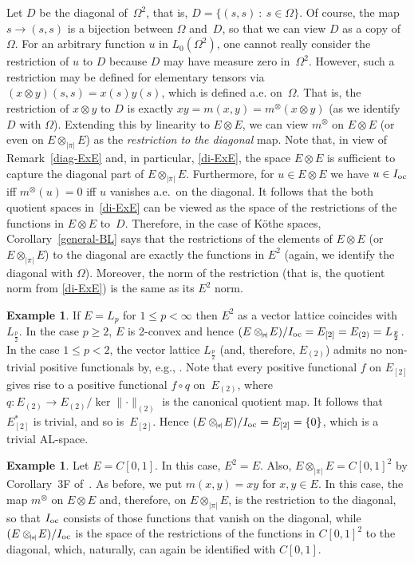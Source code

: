 \documentclass[12pt]{amsart}
\theoremstyle{plain}
\theoremstyle{definition}
\newtheorem{example}[theorem]{Example}
\newcommand{\abs}[1]{\lvert#1\rvert}
\newcommand{\norm}[1]{\lVert#1\rVert}
\renewcommand{\le}{\leqslant}
\renewcommand{\ge}{\geqslant}
\renewcommand{\mid}{\::\:}
\def\api{{\abs{\!\pi\!}}}
\def\ftp{\otimes_{\!\scriptscriptstyle\api}\!}
\def\Ioc{I_{\rm oc}}
\begin{document}
Let $D$ be the diagonal of~$\Omega^2$, that is, $D=\bigl\{(s,s)\mid
s\in\Omega\bigr\}$. Of course, the map $s\to (s,s)$ is a bijection
between $\Omega$ and~$D$, so that we can view $D$ as a copy
of~$\Omega$. For an arbitrary function $u$ in $L_0(\Omega^2)$, one
cannot really consider the restriction of $u$ to $D$ because $D$ may
have measure zero in~$\Omega^2$. However, such a restriction may be
defined for elementary tensors via $(x\otimes y)(s,s)=x(s)y(s)$, which
is defined a.e. on~$\Omega$. That is, the restriction of $x\otimes y$
to $D$ is exactly $xy=m(x,y)=m^\otimes(x\otimes y)$ (as we identify
$D$ with $\Omega$). Extending this by linearity to $E\otimes E$, we
can view $m^\otimes$ on $E\otimes E$ (or even on $E\ftp E$) as the
\textit{restriction to the diagonal} map. Note that, in view of
Remark~\ref{diag-ExE} and, in particular, \eqref{di-ExE}, the space
$E\otimes E$ is sufficient to capture the diagonal part of $E\ftp E$.
Furthermore, for $u\in E\otimes E$ we have $u\in \Ioc$ iff
$m^\otimes(u)=0$ iff $u$ vanishes a.e.\ on the diagonal. It follows
that the both quotient spaces in~\eqref{di-ExE} can be viewed as the
space of the restrictions of the functions in $E\otimes E$ to~$D$.
Therefore, in the case of K\"othe spaces, Corollary~\ref{general-BL}
says that the restrictions of the elements of $E\otimes E$ (or $E\ftp
E$) to the diagonal are exactly the functions in $E^2$ (again, we
identify the diagonal with $\Omega$). Moreover, the norm of the
restriction (that is, the quotient norm from \eqref{di-ExE}) is the
same as its $E^2$ norm.

\begin{example}
\label{examp:Lp}
If $E=L_p$ for $1\le p<\infty$ then $E^2$ as a vector lattice
coincides with $L_{\frac{p}{2}}$. In the case $p\ge 2$, $E$ is
2-convex and hence $(E\ftp
E)/\Ioc=E_{[2]}=E_{(2)}=L_{\frac{p}{2}}$.  In the case $1\le p<2$, the
vector lattice $L_{\frac{p}{2}}$ (and, therefore, $E_{(2)}$) admits no
non-trivial positive functionals by, e.g.,
\cite[Theorem~5.24]{Aliprantis:03}. Note that every positive
functional $f$ on $E_{[2]}$ gives rise to a positive functional
$f\circ q$ on~$E_{(2)}$, where
\begin{math}
  q\colon E_{(2)}\to E_{(2)}/\ker\norm{\cdot}_{(2)}  
\end{math}
is the canonical quotient map. It follows that $E_{[2]}^*$ is trivial,
and so is~$E_{[2]}$. Hence $(E\ftp E)/\Ioc=E_{[2]}=\{0\}$, which is a
trivial AL-space.
\end{example}

\begin{example}
  Let $E=C[0,1]$. In this case, $E^2=E$. Also, $E\ftp E=C[0,1]^2$ by
  Corollary~3F of~\cite{Fremlin:74}. As before, we put $m(x,y)=xy$ for
  $x,y\in E$. In this case, the map $m^\otimes$ on $E\otimes E$ and,
  therefore, on $E\ftp E$, is the restriction to the diagonal, so that
  $\Ioc$ consists of those functions that vanish on the diagonal,
  while $(E\ftp E)/\Ioc$ is the space of the restrictions of the
  functions in $C[0,1]^2$ to the diagonal, which, naturally, can again
  be identified with $C[0,1]$.
\end{example}
\end{document}
